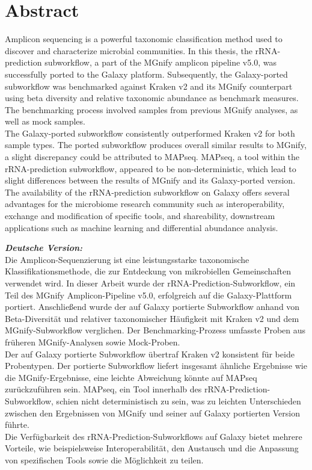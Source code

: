\chapter*{Abstract}
Amplicon sequencing is a powerful taxonomic classification method used to discover and characterize microbial communities. In this thesis, the rRNA-prediction subworkflow, a part of the MGnify amplicon pipeline v5.0, was successfully ported to the Galaxy platform. Subsequently, the Galaxy-ported subworkflow was benchmarked against Kraken v2 and its MGnify counterpart using beta diversity and relative taxonomic abundance as benchmark measures. The benchmarking process involved samples from previous MGnify analyses, as well as mock samples.\\
The Galaxy-ported subworkflow consistently outperformed Kraken v2 for both sample types. The ported subworkflow produces overall similar results to MGnify, a slight discrepancy could be attributed to MAPseq. MAPseq, a tool within the rRNA-prediction subworkflow, appeared to be non-deterministic, which lead to slight differences between the results of MGnify and its Galaxy-ported version.\\
The availability of the rRNA-prediction subworkflow on Galaxy offers several advantages for the microbiome research community such as interoperability, exchange and modification of specific tools, and shareability, downstream applications such as machine learning and differential abundance analysis.


\emph{\textbf{Deutsche Version:}}\\
Die Amplicon-Sequenzierung ist eine leistungsstarke taxonomische Klassifikationsmethode, die zur Entdeckung von mikrobiellen Gemeinschaften verwendet wird. In dieser Arbeit wurde der rRNA-Prediction-Subworkflow, ein Teil des MGnify Amplicon-Pipeline v5.0, erfolgreich auf die Galaxy-Plattform portiert. Anschließend wurde der auf Galaxy portierte Subworkflow anhand von Beta-Diversität und relativer taxonomischer Häufigkeit mit Kraken v2 und dem MGnify-Subworkflow verglichen. Der Benchmarking-Prozess umfasste Proben aus früheren MGnify-Analysen sowie Mock-Proben.\\
Der auf Galaxy portierte Subworkflow übertraf Kraken v2 konsistent für beide Probentypen. Der portierte Subworkflow liefert insgesamt ähnliche Ergebnisse wie die MGnify-Ergebnisse, eine leichte Abweichung könnte auf MAPseq zurückzuführen sein. MAPseq, ein Tool innerhalb des rRNA-Prediction-Subworkflow, schien nicht deterministisch zu sein, was zu leichten Unterschieden zwischen den Ergebnissen von MGnify und seiner auf Galaxy portierten Version führte.\\
Die Verfügbarkeit des rRNA-Prediction-Subworkflows auf Galaxy bietet mehrere Vorteile, wie beispielsweise Interoperabilität, den Austausch und die Anpassung von spezifischen Tools sowie die Möglichkeit zu teilen.